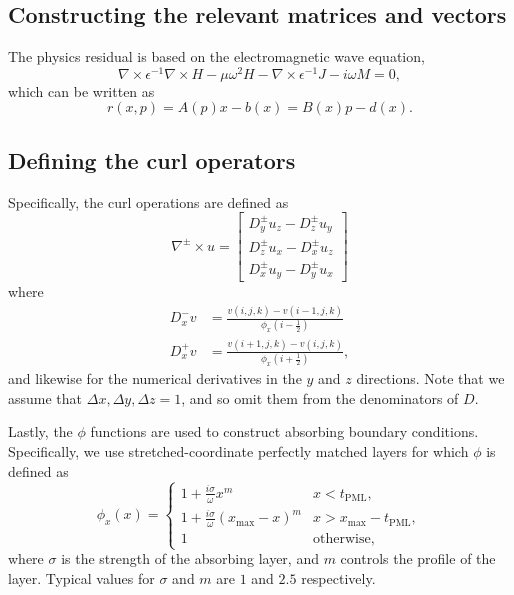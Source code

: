 \documentclass{article}
\begin{document}
\begin{appendix}
\section{Constructing the relevant matrices and vectors}
The physics residual is based on the electromagnetic wave equation, 
    \begin{equation}
    \nabla \times \epsilon^{-1} \nabla \times H - \mu \omega^2 H - 
        \nabla \times \epsilon^{-1} J - i \omega M = 0,
    \end{equation}
    which can be written as
    \begin{equation}
    r(x,p) = A(p) x - b(x) = B(x) p - d(x).
    \end{equation}

\subsection{Defining the curl operators}
Specifically, the curl operations are defined as
    \begin{equation}
    \nabla^\pm \times u = \begin{bmatrix}
        D_y^\pm u_z - D_z^\pm u_y \\
        D_z^\pm u_x - D_x^\pm u_z \\
        D_x^\pm u_y - D_y^\pm u_x
        \end{bmatrix}
    \end{equation}
    where
    \begin{subequations}\begin{align}
    D_x^- v &= \frac{v(i,j,k) - v(i-1,j,k)}{\phi_x(i-\frac{1}{2})} \\
    D_x^+ v &= \frac{v(i+1,j,k) - v(i,j,k)}{\phi_x(i+\frac{1}{2})},
    \end{align}\end{subequations}
    and likewise for the numerical derivatives in the $y$ and $z$ directions.
Note that we assume that $\Delta x, \Delta y, \Delta z = 1$, and so omit them
    from the denominators of $D$.

Lastly, the $\phi$ functions are used to construct 
    absorbing boundary conditions.
Specifically, we use stretched-coordinate perfectly matched layers\cite{scpml}
    for which $\phi$ is defined as
    \begin{equation}
    \phi_x(x) = \begin{cases}
        1 + \frac{i\sigma}{\omega} x^m & x < t_\text{PML}, \\ 
        1 + \frac{i\sigma}{\omega} (x_\text{max} -x)^m
            & x > x_\text{max} - t_\text{PML}, \\ 
        1 & \text{otherwise,}
        \end{cases}
    \end{equation}
    where $\sigma$ is the strength of the absorbing layer, 
    and $m$ controls the profile of the layer.
Typical values for $\sigma$ and $m$ are $1$ and $2.5$ respectively.


\end{appendix}
\end{document}
